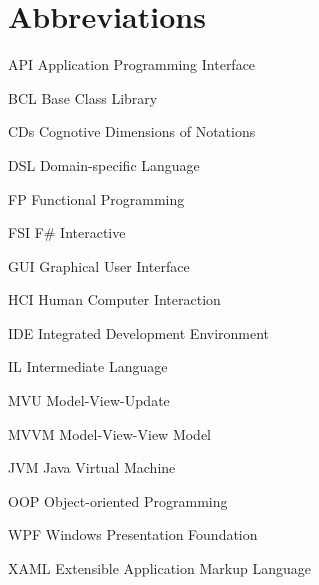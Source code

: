 \section*{Abbreviations}

\begin{abbrv}
 
\item[API] Application Programming Interface
\item[BCL] Base Class Library
\item[CDs] Cognotive Dimensions of Notations
\item[DSL] Domain-specific Language
\item[FP] Functional Programming
\item[FSI] F\# Interactive 
\item[GUI] Graphical User Interface
\item[HCI] Human Computer Interaction 
\item[IDE] Integrated Development Environment
\item[IL] Intermediate Language
\item[MVU] Model-View-Update
\item[MVVM] Model-View-View Model
\item[JVM] Java Virtual Machine
\item[OOP] Object-oriented Programming
\item[WPF] Windows Presentation Foundation
\item[XAML] Extensible Application Markup Language
 
\end{abbrv}
